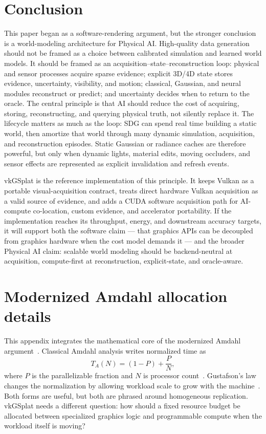 \documentclass[10pt,journal,onecolumn]{IEEEtran}
\begin{document}
\section{Conclusion}

This paper began as a software-rendering argument, but the stronger conclusion
is a world-modeling architecture for Physical AI. High-quality data generation
should not be framed as a choice between calibrated simulation and learned
world models. It should be framed as an acquisition--state--reconstruction loop:
physical and sensor processes acquire sparse evidence; explicit 3D/4D state
stores evidence, uncertainty, visibility, and motion; classical, Gaussian, and
neural modules reconstruct or predict; and uncertainty decides when to return to
the oracle. The central principle is that AI should reduce the cost of acquiring,
storing, reconstructing, and querying physical truth, not silently replace it.
The lifecycle matters as much as the loop: SDG can spend real time building a
static world, then amortize that world through many dynamic simulation,
acquisition, and reconstruction episodes. Static Gaussian or radiance caches are
therefore powerful, but only when dynamic lights, material edits, moving
occluders, and sensor effects are represented as explicit invalidation and
refresh events.

vkGSplat is the reference implementation of this principle. It keeps Vulkan as a
portable visual-acquisition contract, treats direct hardware Vulkan acquisition
as a valid source of evidence, and adds a CUDA software acquisition path for
AI-compute co-location, custom evidence, and accelerator portability. If the
implementation reaches its throughput, energy, and downstream accuracy targets,
it will support both the software claim --- that graphics APIs can be decoupled
from graphics hardware when the cost model demands it --- and the broader
Physical AI claim: scalable world modeling should be backend-neutral at
acquisition, compute-first at reconstruction, explicit-state, and oracle-aware.

\appendices
\section{Modernized Amdahl allocation details}
\label{app:amdahl}

This appendix integrates the mathematical core of the modernized Amdahl
argument~\cite{lu2026amdahl}.  Classical Amdahl analysis writes
normalized time as
\begin{equation}
  T_A(N) = (1-P) + \frac{P}{N},
  \label{eq:appendix-amdahl}
\end{equation}
where $P$ is the parallelizable fraction and $N$ is processor
count~\cite{amdahl1967}.  Gustafson's law changes the normalization by
allowing workload scale to grow with the machine~\cite{gustafson1988}.
Both forms are useful, but both are phrased around homogeneous
replication.  vkGSplat needs a different question: how should a fixed
resource budget be allocated between specialized graphics logic and
programmable compute when the workload itself is moving?
\end{document}

